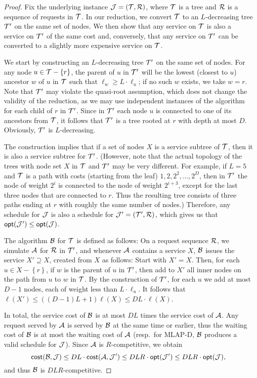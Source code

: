 \documentclass[a4paper]{article}
\newcommand{\calA}{{\cal A}}
\newcommand{\calB}{{\cal B}}
\newcommand{\calJ}{{\cal J}}
\newcommand{\calR}{{\cal R}}
\newcommand{\calT}{{\cal T}}
\newcommand{\braced}[1]{{ \left\{ #1 \right\} }}
\newcommand{\cost}{\mbox{\rm\textsf{cost}}}
\newcommand{\opt}{\mbox{\rm\textsf{opt}}}
\newcommand{\length}{\ell}
\newcommand{\MLAPD}{\mbox{\rm\textsf{MLAP-D}}}
\begin{document}
\begin{proof}
Fix the underlying instance $\calJ = (\calT,\calR)$, where $\calT$ is
a tree and $\calR$ is a sequence of requests in $\calT$.  In our
reduction, we convert $\calT$ to an $L$-decreasing tree $\calT'$ on
the same set of nodes. We then show that any service on $\calT$ is
also a service on $\calT'$ of the same cost and, conversely, that any
service on $\calT'$ can be converted to a slightly more expensive
service on $\calT$.

We start by constructing 
an $L$-decreasing tree $\calT'$ on the same set of nodes. For any node
$u\in \calT-\braced{r}$, the parent of $u$ in $\calT'$ will be the
lowest (closest to $u$) ancestor $w$ of $u$ in $\calT$ such that
$\length_w \geq L\cdot \length_u$; if no such $w$ exists, we take
$w=r$. Note that $\calT'$ may violate the quasi-root assumption, which
does not change the validity of the reduction, as we may use
independent instances of the algorithm for each child of $r$ in
$\calT'$.
Since in $\calT'$ each node $u$ is connected to one of its ancestors
from $\calT$, it follows that $\calT'$ is a tree rooted at $r$ with
depth at most $D$. Obviously, $\calT'$ is $L$-decreasing.

The construction implies that if a set of nodes $X$
is a service subtree of $\calT$, then it is also a service subtree for
$\calT'$.  (However, note that the actual topology of
the trees with node set $X$ in $\calT$ and $\calT'$ may be very different.
For example, if $L=5$ and $\calT$ is a path with costs
(starting from the leaf) $1, 2, 2^2, ..., 2^D$, then in $\calT'$ the
node of weight $2^i$ is connected to the node of weight $2^{i+3}$,
except for the last three nodes that are connected to $r$. Thus the
resulting tree consists of three paths ending at $r$ with roughly
the same number of nodes.)
Therefore, any schedule for $\calJ$ is also a schedule for $\calJ' =
(\calT',\calR)$, which gives us that $\opt(\calJ')\leq \opt(\calJ)$.

The algorithm $\calB$ for $\calT$ is defined as follows: On a request
sequence $\calR$, we simulate $\calA$ for $\calR$ in $\calT'$, and
whenever $\calA$ contains a service $X$, $\calB$ issues the service
$X' \supseteq X$, created from $X$ as follows:
Start with $X'=X$. Then,
for each $u\in X-\braced{r}$, if $w$ is the parent of $u$ in $\calT'$, then
add to $X'$ all inner nodes on the path from $u$ to $w$ in
$\calT$. By the construction of $\calT'$, for each $u$ we add at most
$D-1$ nodes, each of weight less than $L\cdot \length_u$. It follows that
$\length(X')\leq ((D-1)L+1)\length(X)\leq DL\cdot \length(X)$.

In total, the service cost of $\calB$ is at most $DL$ times the
service cost of $\calA$. Any request served by $\calA$ is served by
$\calB$ at the same time or earlier, thus the waiting cost of $\calB$
is at most the waiting cost of $\calA$ (resp.~for {\MLAPD}, $\calB$
produces a valid schedule for $\calJ$). 
Since $\calA$ is $R$-competitive, we obtain 
\[
\cost(\calB,\calJ)\leq DL\cdot\cost(\calA,\calJ')
			\leq DLR\cdot \opt(\calJ')
			\leq DLR \cdot \opt(\calJ),
\]
and thus $\calB$ is $DLR$-competitive.
\end{proof}
\end{document}

